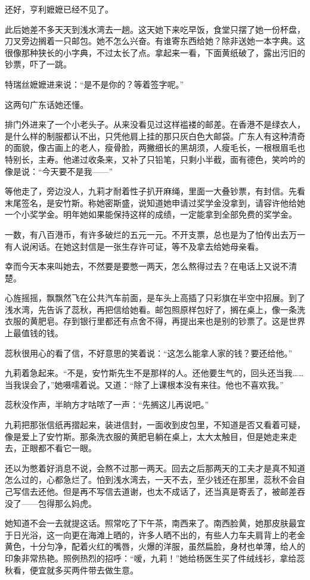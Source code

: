 \par 还好，亨利嬷嬷已经不见了。
\par 此后她差不多天天到浅水湾去一趟。这天她下来吃早饭，食堂只摆了她一份杯盘，刀叉旁边搁着一只邮包。她不怎么兴奋。有谁寄东西给她？除非送她一本字典。这很像那种狭长的小字典，不过太长了点。拿起来一看，下面黄纸破了，露出污旧的钞票，吓了一跳。
\par 特瑞丝嬷嬷进来说：“是不是你的？等着签字呢。”
\par 这两句广东话她还懂。
\par 排门外进来了一个小老头子。从来没看见过这样褴褛的邮差。在香港不是绿衣人，是什么样的制服都认不出，只凭他肩上挂的那只灰白色大邮袋。广东人有这种清奇的面貌，像古画上的老人，瘦骨脸，两撇细长的黑胡须，人瘦毛长，一根根眉毛也特别长，主寿。他递过收条来，又补了只铅笔，只剩小半截，面有德色，笑吟吟的像是说：“今天要不是我——”
\par 等他走了，旁边没人，九莉才耐着性子扒开麻绳，里面一大叠钞票，有封信。先看末尾签名，是安竹斯。称她密斯盛，说知道她申请过奖学金没拿到，请容许他给她一个小奖学金。明年她如果能保持这样的成绩，一定能拿到全部免费的奖学金。
\par 一数，有八百港币，有许多破烂的五元一元。不开支票，总也是为了怕传出去万一有人说闲话。在她这封信是一张生存许可证，等不及拿去给她母亲看。
\par 幸而今天本来叫她去，不然要是要憋一两天，怎么熬得过去？在电话上又说不清楚。
\par 心旌摇摇，飘飘然飞在公共汽车前面，是车头上高插了只彩旗在半空中招展。到了浅水湾，先告诉了蕊秋，再把信给她看。邮包照原样包好了，搁在桌上，像一条洗衣服的黄肥皂。存到银行里都还有点舍不得，再提出来也是别的钞票了。这是世界上最值钱的钱。
\par 蕊秋很用心的看了信，不好意思的笑着说：“这怎么能拿人家的钱？要还给他。”
\par 九莉着急起来。“不是，安竹斯先生不是那样的人。还他要生气的，回头还当我……当我误会了，”她嗫嚅着说。又道：“除了上课根本没有来往。他也不喜欢我。”
\par 蕊秋没作声，半晌方才咕哝了一声：“先搁这儿再说吧。”
\par 九莉把那张信纸再摺起来，装进信封，一面收到皮包里，不知道是否又看着可疑，像是爱上了安竹斯。那条洗衣服的黄肥皂躺在桌上，太大太触目，但是她走来走去，正眼都不看它一眼。
\par 还以为憋着好消息不说，会熬不过那一两天。回去之后那两天的工夫才是真不知道怎么过的，心都急烂了。怕到浅水湾去，一天不去，至少钱还在那里，蕊秋不会自己写信去还他。但是再不写信去道谢，也太不成话了，还当真是寄丢了，被邮差吞没了——包得那么妈虎。
\par 她知道不会一去就提这话。照常吃了下午茶，南西来了。南西脸黄，她那皮肤最宜于日光浴，这一向更在海滩上晒的，许多人晒不出的，有些人力车夫肩背上的老金黄色，十分匀净，配着火红的嘴唇，火爆的洋服，虽然扁脸，身材也单薄，给人的印象非常热艳。照例热烈的招呼：“嗳，九莉！”她给杨医生买了件绒线衫，拿给蕊秋看，便宜就多买两件带去做生意。
